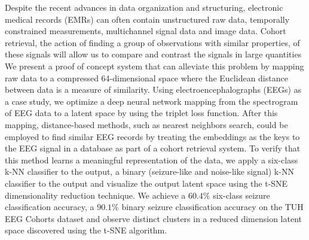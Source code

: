 \begin{abstractlong}
	Despite the recent advances in data organization and structuring, electronic medical records (EMRs) can often contain unstructured raw data, temporally constrained measurements, multichannel signal data and image data. Cohort retrieval, the action of finding a group of observations with similar properties, of these signals will allow us to compare and contrast the signals in large quantities We present a proof of concept system that can alleviate this problem by mapping raw data to a compressed 64-dimensional space where the Euclidean distance between data is a measure of similarity. Using electroencephalographs (EEGs) as a case study, we optimize a deep neural network mapping from the spectrogram of EEG data to a latent space by using the triplet loss function. After this mapping, distance-based methods, such as nearest neighbors search, could be employed to find similar EEG records by treating the embeddings as the keys to the EEG signal in a database as part of a cohort retrieval system. To verify that this method learns a meaningful representation of the data, we apply a six-class k-NN classifier to the output, a binary (seizure-like and noise-like signal) k-NN classifier to the output and visualize the output latent space using the t-SNE dimensionality reduction technique. We achieve a $60.4\%$ six-class seizure classification accuracy, a $90.1\%$ binary seizure classification accuracy on the TUH EEG Cohorts dataset and observe distinct clusters in a reduced dimension latent space discovered using the t-SNE algorithm. 		
\end{abstractlong}